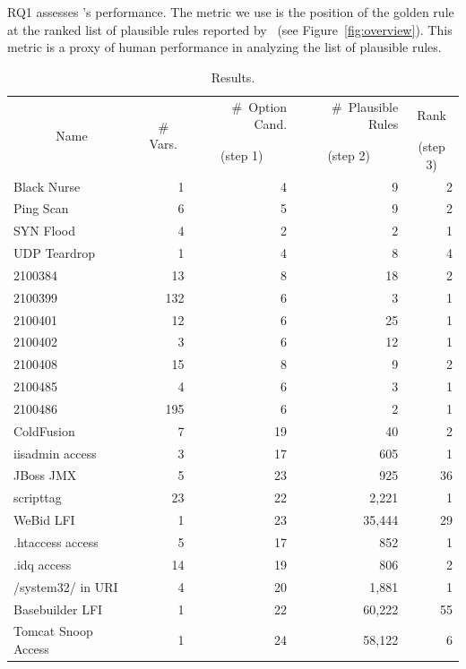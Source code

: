 \documentclass[conference]{IEEEtran}
\begin{document}
RQ1 assesses \tname's performance. The metric we use is the position
of the golden rule at the ranked list of plausible rules reported by
\tname\ (see Figure~\ref{fig:overview}). This metric is a proxy of
human performance in analyzing the list of plausible rules.

\begin{table}[t!]
  \footnotesize
  \setlength{\tabcolsep}{2pt}
  \renewcommand{\arraystretch}{0.5}
  \caption{\label{table:results}Results.}
  \vspace{-2ex}
  \centering
  \begin{tabular}{lrrrr}
    \toprule
    \multicolumn{1}{c}{\multirow{2}{*}{Name}} &
    \multicolumn{1}{c}{\multirow{2}{*}{\# Vars.}} &
    \#~Option Cand. &
    \#~Plausible Rules &    
    \multicolumn{1}{c}{Rank} \\

     &
    \multicolumn{1}{c}{} &
    \multicolumn{1}{c}{(step 1)} &
    \multicolumn{1}{c}{(step 2)} &    
    \multicolumn{1}{c}{(step 3)} \\

    \midrule
    Black Nurse & 1 & 4 & 9 & 2 \\    
    Ping Scan & 6 & 5 & 9 & 2 \\
    SYN Flood & 4 & 2 & 2 & 1 \\
    UDP Teardrop & 1 & 4 & 8 & 4 \\
    2100384 & 13 & 8 & 18 & 2 \\
    2100399 & 132 & 6 & 3 & 1 \\
    2100401 & 12 & 6 & 25 & 1 \\
    2100402 & 3 & 6 & 12 & 1 \\
    2100408 & 15 & 8 & 9 & 2 \\
    2100485 & 4 & 6 & 3 & 1 \\
    2100486 & 195 & 6 & 2 & 1 \\
    \midrule
    ColdFusion & 7 & 19 & 40 & 2\\
    iisadmin access & 3 & 17 & 605 & 1 \\        
    JBoss JMX & 5 & 23 & 925 & 36 \\
    scripttag & 23 & 22 & 2,221 & 1 \\
    WeBid LFI & 1 & 23 & 35,444 & 29\\    
    .htaccess access & 5 & 17 & 852 & 1\\
    .idq access & 14 & 19 & 806 & 2 \\
    /system32/ in URI & 4 & 20 & 1,881 & 1 \\
    Basebuilder LFI & 1 & 22 & 60,222 & 55 \\
    Tomcat Snoop Access & 1 & 24 & 58,122 & 6 \\
    \bottomrule
  \end{tabular}
\end{table}
\end{document}
